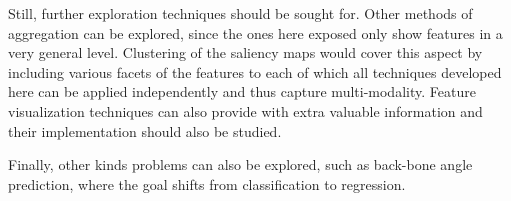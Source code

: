 Still, further exploration techniques should be sought for. Other methods of aggregation can be explored, since the ones here exposed only show features in a very general level. Clustering of the saliency maps would cover this aspect by including various facets of the features to each of which all techniques developed here can be applied independently and thus capture multi-modality. Feature visualization techniques can also provide with extra valuable information and their implementation should also be studied.

Finally, other kinds problems can also be explored, such as back-bone angle prediction, where the goal shifts from classification to regression.